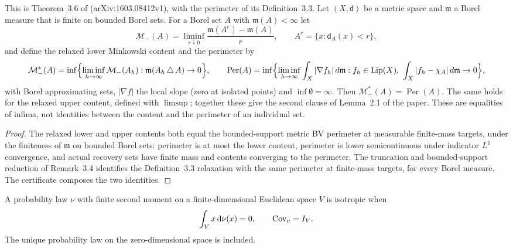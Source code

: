 \begin{theorem}
  \label{thm:relaxed-minkowski-content-perimeter}
  \leanok
  This is Theorem~3.6 of \cite{AmbrosioDiMarinoGigli2017Minkowski} (arXiv:1603.08412v1), with
  the perimeter of its Definition~3.3.  Let $(X,\mathsf d)$ be a metric space and $\mathfrak m$ a
  Borel measure that is finite on bounded Borel sets.  For a Borel set $A$ with
  $\mathfrak m(A)<\infty$ let
  \[
    \mathcal M_-(A)=\liminf_{r\downarrow 0}\frac{\mathfrak m(A^r)-\mathfrak m(A)}{r},\qquad
    A^r=\{x:\mathsf d_A(x)<r\},
  \]
  and define the relaxed lower Minkowski content and the perimeter by
  \[
    \mathcal M_-^\ast(A)=\inf\Bigl\{\liminf_{h\to\infty}\mathcal M_-(A_h):
      \mathfrak m(A_h\,\triangle\,A)\to 0\Bigr\},\qquad
    \operatorname{Per}(A)=\inf\Bigl\{\liminf_{h\to\infty}\int_X|\nabla f_h|\,d\mathfrak m:
      f_h\in\operatorname{Lip}(X),\ \int_X|f_h-\chi_A|\,d\mathfrak m\to 0\Bigr\},
  \]
  with Borel approximating sets, $|\nabla f|$ the local slope (zero at isolated points) and
  $\inf\emptyset=\infty$.  Then $\mathcal M_-^\ast(A)=\operatorname{Per}(A)$.  The same holds for
  the relaxed upper content, defined with $\limsup$; together these give the second clause of
  Lemma~2.1 of the paper.  These are equalities of infima, not identities between the content
  and the perimeter of an individual set.
\end{theorem}
\begin{proof}
  \leanok
  The relaxed lower and upper contents both equal the bounded-support metric BV perimeter at
  measurable finite-mass targets, under the finiteness of $\mathfrak m$ on bounded Borel sets:
  perimeter is at most the lower content, perimeter is lower semicontinuous under indicator
  $L^1$ convergence, and actual recovery sets have finite mass and contents converging to the
  perimeter.  The truncation and bounded-support reduction of Remark~3.4 identifies the
  Definition~3.3 relaxation with the same perimeter at finite-mass targets, for every Borel
  measure.  The certificate composes the two identities.
\end{proof}

\begin{definition}
  \label{def:isotropic-law}
  \leanok
  A probability law $\nu$ with finite second moment on a finite-dimensional Euclidean space $V$
  is isotropic when
  \[
    \int_V x\,\mathrm d\nu(x)=0,
    \qquad
    \operatorname{Cov}_\nu=I_V.
  \]
  The unique probability law on the zero-dimensional space is included.
\end{definition}

